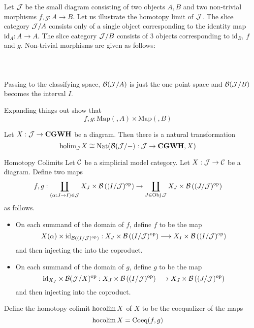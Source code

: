 \documentclass[a4paper]{article}
\begin{document}
Let $\mathcal{J}$ be the small diagram consisting of two objects $A,B$ and two non-trivial morphisms $f,g:A\to B$. Let us illustrate the homotopy limit of $\mathcal{J}$. The slice category $\mathcal{J}/A$ consists only of a single object corresponding to the identity map $\text{id}_A:A\to A$. The slice category $\mathcal{J}/B$ consists of $3$ objects corresponding to $\text{id}_B$, $f$ and $g$. Non-trivial morphisms are given as follows: \\~\\
\\~\\
Passing to the classifying space, $\mathcal{B}(\mathcal{J}/A)$ is just the one point space and $\mathcal{B}(\mathcal{J}/B)$ becomes the interval $I$. 

Expanding things out show that $$f,g:\text{Map}(,A)\times\text{Map}(,B)$$ 

\begin{prp}{}{} Let $X:\mathcal{J}\to\bold{CGWH}$ be a diagram. Then there is a natural transformation $$\text{holim}_{\mathcal{J}} X\cong\text{Nat}(\mathcal{B}(\mathcal{J}/-):\mathcal{J}\to\bold{CGWH},X)$$
\end{prp}

\begin{defn}{Homotopy Colimits}{} Let $\mathcal{C}$ be a simplicial model category. Let $X:\mathcal{J}\to\mathcal{C}$ be a diagram. Define two maps $$f,g:\coprod_{(\alpha:J\to I)\in\mathcal{J}}X_J\times\mathcal{B}\left((I/\mathcal{J})^\text{op}\right)\to\coprod_{J\in\operatorname{Obj}\mathcal{J}}X_J\times\mathcal{B}\left((J/\mathcal{J})^\text{op}\right)$$ as follows. 
\begin{itemize}
\item On each summand of the domain of $f$, define $f$ to be the map $$X(\alpha)\times\text{id}_{\mathcal{B}\left((I/\mathcal{J})^\text{op}\right)}:X_J\times\mathcal{B}\left((I/\mathcal{J})^\text{op}\right)\longrightarrow X_I\times\mathcal{B}\left((I/\mathcal{J})^\text{op}\right)$$ and then injecting the into the coproduct. 
\item On each summand of the domain of $g$, define $g$ to be the map $$\text{id}_{X_J}\times\mathcal{B}(\mathcal{J}/X)^\text{op}:X_J\times\mathcal{B}\left((I/\mathcal{J})^\text{op}\right)\longrightarrow X_J\times\mathcal{B}\left((J/\mathcal{J})^\text{op}\right)$$ and then injecting into the coproduct. 
\end{itemize}
Define the homotopy colimit $\operatorname*{hocolim} X$ of $X$ to be the coequalizer of the maps $$\operatorname*{hocolim} X=\text{Coeq}(f,g)$$
\end{defn}
\end{document}
